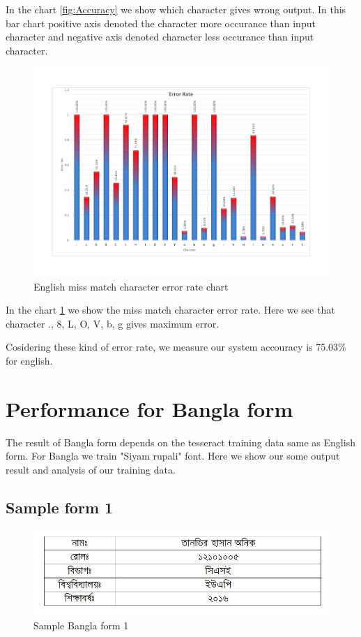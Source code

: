 In the chart \ref{fig:Accuracy} we show which character gives wrong output. In this bar chart positive axis denoted the character more occurance than input character and negative axis denoted character less occurance than input character.

\begin{figure}[H]
\centering
\includegraphics[width=1\textwidth]{EError.pdf}
\caption {English miss match character error rate chart}
\label {fig:Eerror}
\end{figure}

In the chart \ref{fig:Eerror} we show the miss match character error rate. Here we see that character ., 8, L, O, V, b, g gives maximum error.

Cosidering these kind of error rate, we measure our system accouracy is 75.03\% for english.
\newpage

\section{Performance for Bangla form}
The result of Bangla form depends on the tesseract training data same as English form. For Bangla we train "Siyam rupali" font. Here we show our some output result and analysis of our training data.
\subsection{Sample form 1}
\begin{figure}[H]
\centering
\includegraphics[width=1\textwidth]{formBen01.JPG}
\caption {Sample Bangla form 1}
\label {fig:FormBan1}
\end{figure}

